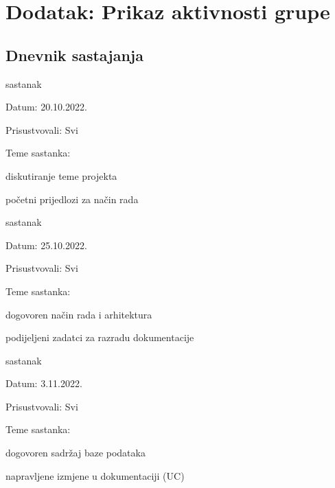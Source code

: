 \chapter*{Dodatak: Prikaz aktivnosti grupe}

    \section*{Dnevnik sastajanja}
    
    \begin{packed_enum}
        \item sastanak
        
        \item[] \begin{packed_item}
				\item Datum: 20.10.2022.
				\item Prisustvovali: Svi
				\item Teme sastanka:
				\begin{packed_item}
					\item  diskutiranje teme projekta
					\item  početni prijedlozi za način rada
				\end{packed_item}
			\end{packed_item}
			
		\item sastanak
        
        \item[] \begin{packed_item}
				\item Datum: 25.10.2022.
				\item Prisustvovali: Svi
				\item Teme sastanka:
				\begin{packed_item}
					\item  dogovoren način rada i arhitektura
					\item  podijeljeni zadatci za razradu dokumentacije
				\end{packed_item}
			\end{packed_item}
			
		\item sastanak
        
        \item[] \begin{packed_item}
				\item Datum: 3.11.2022.
				\item Prisustvovali: Svi
				\item Teme sastanka:
				\begin{packed_item}
					\item  dogovoren sadržaj baze podataka
					\item  napravljene izmjene u dokumentaciji (UC)
				\end{packed_item}
			\end{packed_item}
			
    \end{packed_enum}

